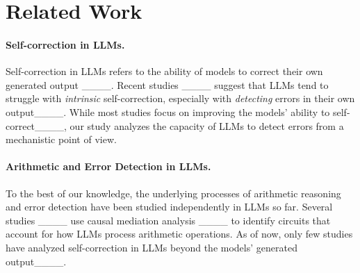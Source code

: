 \section{Related Work}
\label{sec:Related_Work}
\paragraph{Self-correction in LLMs.} Self-correction in LLMs refers to the ability of models to correct their own generated output ____. Recent studies ____ suggest that LLMs tend to struggle with \textit{intrinsic} self-correction, especially with \emph{detecting} errors in their own output____. While most studies focus on improving the models' ability to self-correct____, our study analyzes the capacity of LLMs to detect errors from a mechanistic point of view.

\paragraph{Arithmetic and Error Detection in LLMs.} To the best of our knowledge, the underlying processes of arithmetic reasoning and error detection have been studied independently in LLMs so far. Several studies ____ use causal mediation analysis ____ to identify circuits that account for how LLMs process arithmetic operations. As of now, only few studies have analyzed self-correction in LLMs beyond the models' generated output____.